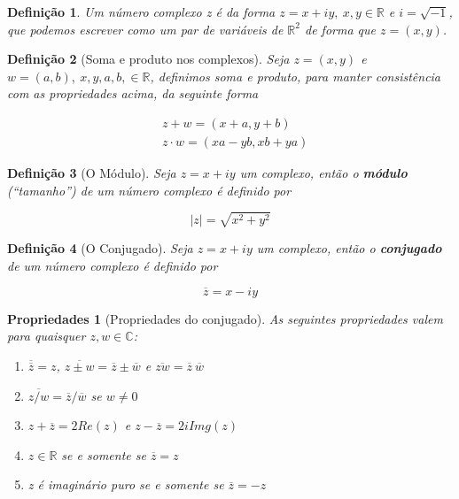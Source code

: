 \documentclass{article}
\newtheorem{prop}{Propriedades}
\newtheorem{definition}{Definição}
\begin{document}
\begin{definition}
Um número complexo z é da forma $z = x + iy, \ x,y \in \mathbb{R}$ e $i = \sqrt{-1}$, que podemos escrever como um par de variáveis de $\mathbb{R}^2$ de forma que $z = (x, y)$.
\end{definition}

\begin{definition}[Soma e produto nos complexos]
Seja $z = (x, y)$ e $w = (a, b),\ x,y,a,b, \in \mathbb{R}$, definimos soma e produto, para manter consistência com as propriedades acima, da seguinte forma

\begin{align}
    &z + w = (x + a, y + b) \nonumber \\
    &z \cdot w = (xa - yb, xb + ya) \nonumber
\end{align}
\end{definition}

\begin{definition}[O Módulo]
Seja $z = x + iy$ um complexo, então o \textbf{módulo} (``tamanho'') de um número complexo é definido por

$$\mid z \mid = \sqrt{x^2 + y^2}$$
\end{definition}

\begin{definition}[O Conjugado]
Seja $z = x + iy$ um complexo, então o \textbf{conjugado} de um número complexo é definido por

$$\overline{z} = x - i y$$
\end{definition}

\begin{prop}[Propriedades do conjugado] As seguintes propriedades valem para quaisquer $z, w \in \mathbb{C}$:

\begin{enumerate}[label=(\alph*)]
    \item $\overline{\overline{z}} = z$, $\overline{z \pm w} = \overline{z} \pm \overline{w}$ e $\overline{z w} = \overline{z} \ \overline{w}$
    
    \item $\overline{z/w} = \overline{z}/\overline{w}$ se $w \neq 0$
    
    \item $z + \overline{z} = 2 Re(z)$ e $z - \overline{z} = 2i Img(z)$
    
    \item $z \in \mathbb{R}$ se e somente se $\overline{z} = z$
    
    \item z é imaginário puro se e somente se $\overline{z} = -z$
\end{enumerate}
\end{prop}
\end{document}
